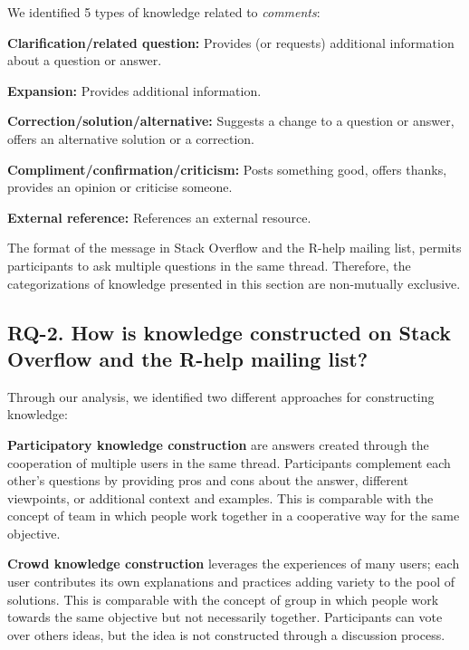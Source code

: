     We identified 5 types of knowledge related to \textit{comments}:
    \begin{packed_enum}
        \item \textbf{Clarification/related question:} Provides (or requests) additional information about a question or answer.
        \item \textbf{Expansion:} Provides additional information.
        \item \textbf{Correction/solution/alternative:} Suggests a change to a question or answer, offers an alternative solution or a correction.
        \item \textbf{Compliment/confirmation/criticism:} Posts something good, offers thanks, provides an opinion or criticise someone.
        \item \textbf{External reference:} References an external resource.
    \end{packed_enum}

    The format of the message in Stack Overflow and the R-help mailing list, permits participants to ask multiple questions in the same thread.
    Therefore, the categorizations of knowledge presented in this section are non-mutually exclusive.

\subsection{RQ-2. How is knowledge constructed on Stack Overflow and the R-help mailing list?}
\label{sec:rq2}


    Through our analysis, we identified two different approaches for constructing knowledge:
    \begin{packed_enum}
        \item \textbf{Participatory knowledge construction} are answers created through the cooperation of multiple users in the same thread.
        Participants complement each other's questions by providing pros and cons about the answer, different viewpoints, or additional context and examples.
        This is comparable with the concept of team in which people work together in a cooperative way for the same objective.

        \item \textbf{Crowd knowledge construction} leverages the experiences of many users; each user contributes its own explanations and practices adding variety to the pool of solutions.
        This is comparable with the concept of group in which people work towards the same objective but not necessarily together.
        Participants can vote over others ideas, but the idea is not constructed through a discussion process.
    \end{packed_enum}

